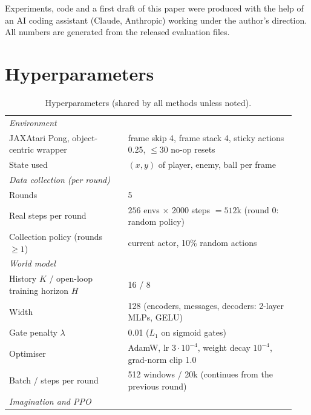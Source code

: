 \documentclass{article}
\begin{document}
\begin{ack}
Experiments, code and a first draft of this paper were produced with the help of an AI coding
assistant (Claude, Anthropic) working under the author's direction. All numbers are generated from the
released evaluation files.
\end{ack}




\newpage
\appendix

\section{Hyperparameters}
\label{app:hparams}

\begin{table}[h]
  \caption{Hyperparameters (shared by all methods unless noted).}
  \centering
  \small
  \begin{tabular}{p{0.39\linewidth}p{0.55\linewidth}}
    \toprule
    \multicolumn{2}{l}{\emph{Environment}}\\
    JAXAtari Pong, object-centric wrapper & frame skip 4, frame stack 4, sticky actions 0.25, $\leq$30 no-op resets\\
    State used & $(x, y)$ of player, enemy, ball per frame \\
    \midrule
    \multicolumn{2}{l}{\emph{Data collection (per round)}}\\
    Rounds & 5 \\
    Real steps per round & $256$ envs $\times$ 2000 steps $= 512$k (round 0: random policy) \\
    Collection policy (rounds $\geq 1$) & current actor, 10\% random actions \\
    \midrule
    \multicolumn{2}{l}{\emph{World model}}\\
    History $K$ / open-loop training horizon $H$ & 16 / 8 \\
    Width & 128 (encoders, messages, decoders: 2-layer MLPs, GELU) \\
    Gate penalty $\lambda$ & 0.01 ($L_1$ on sigmoid gates) \\
    Optimiser & AdamW, lr $3\cdot10^{-4}$, weight decay $10^{-4}$, grad-norm clip 1.0 \\
    Batch / steps per round & 512 windows / 20k (continues from the previous round) \\
    \midrule
    \multicolumn{2}{l}{\emph{Imagination and PPO}}\\

\end{tabular}
\end{table}
\end{document}
